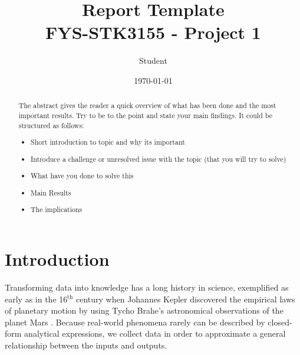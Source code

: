 \documentclass[amssymb,twocolumn,aps]{revtex4}
\begin{document}
	
\title{Report Template \\
    \normalsize FYS-STK3155 - Project 1}
\date{\today}               
\author{Student}

\newpage
	
\begin{abstract}
The abstract gives the reader a quick overview of what has been done and the most important results. Try to be to the point and state your main findings. It could be structured as follows:
\begin{itemize}
    \item Short introduction to topic and why its important
    \item Introduce a challenge or unresolved issue with the topic (that you will try to solve)
    \item What have you done to solve this
    \item Main Results
    \item The implications
\end{itemize}
\end{abstract}

\maketitle

\section{Introduction}


Transforming data into knowledge has a long history in science, exemplified  as early as in the 16$^{\text{th}}$ century when Johannes Kepler discovered the empirical laws of planetary motion\cite{patrec} by using Tycho Brahe's astronomical observations of the planet Mars \cite{Yamahata_2024}. Because real-world phenomena rarely can be described by closed-form analytical expressions, we collect data in order to approximate a general relationship between the inputs and outputs.
\end{document}
